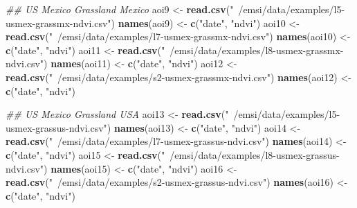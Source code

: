 \documentclass[
]{article}
\newenvironment{Shaded}{\begin{snugshade}}{\end{snugshade}}
\newcommand{\CommentTok}[1]{\textcolor[rgb]{0.56,0.35,0.01}{\textit{#1}}}
\newcommand{\KeywordTok}[1]{\textcolor[rgb]{0.13,0.29,0.53}{\textbf{#1}}}
\newcommand{\NormalTok}[1]{#1}
\newcommand{\StringTok}[1]{\textcolor[rgb]{0.31,0.60,0.02}{#1}}
\begin{document}
\begin{Shaded}
\begin{Highlighting}[]
\CommentTok{## US Mexico Grassland Mexico}
\NormalTok{aoi9 <-}\StringTok{ }\KeywordTok{read.csv}\NormalTok{(}\StringTok{"~/emsi/data/examples/l5-usmex-grassmx-ndvi.csv"}\NormalTok{)}
\KeywordTok{names}\NormalTok{(aoi9) <-}\StringTok{ }\KeywordTok{c}\NormalTok{(}\StringTok{"date"}\NormalTok{, }\StringTok{"ndvi"}\NormalTok{)}
\NormalTok{aoi10 <-}\StringTok{ }\KeywordTok{read.csv}\NormalTok{(}\StringTok{"~/emsi/data/examples/l7-usmex-grassmx-ndvi.csv"}\NormalTok{)}
\KeywordTok{names}\NormalTok{(aoi10) <-}\StringTok{ }\KeywordTok{c}\NormalTok{(}\StringTok{"date"}\NormalTok{, }\StringTok{"ndvi"}\NormalTok{)}
\NormalTok{aoi11 <-}\StringTok{ }\KeywordTok{read.csv}\NormalTok{(}\StringTok{"~/emsi/data/examples/l8-usmex-grassmx-ndvi.csv"}\NormalTok{)}
\KeywordTok{names}\NormalTok{(aoi11) <-}\StringTok{ }\KeywordTok{c}\NormalTok{(}\StringTok{"date"}\NormalTok{, }\StringTok{"ndvi"}\NormalTok{)}
\NormalTok{aoi12 <-}\StringTok{ }\KeywordTok{read.csv}\NormalTok{(}\StringTok{"~/emsi/data/examples/s2-usmex-grassmx-ndvi.csv"}\NormalTok{)}
\KeywordTok{names}\NormalTok{(aoi12) <-}\StringTok{ }\KeywordTok{c}\NormalTok{(}\StringTok{"date"}\NormalTok{, }\StringTok{"ndvi"}\NormalTok{)}

\CommentTok{## US Mexico Grassland USA}
\NormalTok{aoi13 <-}\StringTok{ }\KeywordTok{read.csv}\NormalTok{(}\StringTok{"~/emsi/data/examples/l5-usmex-grassus-ndvi.csv"}\NormalTok{)}
\KeywordTok{names}\NormalTok{(aoi13) <-}\StringTok{ }\KeywordTok{c}\NormalTok{(}\StringTok{"date"}\NormalTok{, }\StringTok{"ndvi"}\NormalTok{)}
\NormalTok{aoi14 <-}\StringTok{ }\KeywordTok{read.csv}\NormalTok{(}\StringTok{"~/emsi/data/examples/l7-usmex-grassus-ndvi.csv"}\NormalTok{)}
\KeywordTok{names}\NormalTok{(aoi14) <-}\StringTok{ }\KeywordTok{c}\NormalTok{(}\StringTok{"date"}\NormalTok{, }\StringTok{"ndvi"}\NormalTok{)}
\NormalTok{aoi15 <-}\StringTok{ }\KeywordTok{read.csv}\NormalTok{(}\StringTok{"~/emsi/data/examples/l8-usmex-grassus-ndvi.csv"}\NormalTok{)}
\KeywordTok{names}\NormalTok{(aoi15) <-}\StringTok{ }\KeywordTok{c}\NormalTok{(}\StringTok{"date"}\NormalTok{, }\StringTok{"ndvi"}\NormalTok{)}
\NormalTok{aoi16 <-}\StringTok{ }\KeywordTok{read.csv}\NormalTok{(}\StringTok{"~/emsi/data/examples/s2-usmex-grassus-ndvi.csv"}\NormalTok{)}
\KeywordTok{names}\NormalTok{(aoi16) <-}\StringTok{ }\KeywordTok{c}\NormalTok{(}\StringTok{"date"}\NormalTok{, }\StringTok{"ndvi"}\NormalTok{)}


\end{Highlighting}
\end{Shaded}
\end{document}
